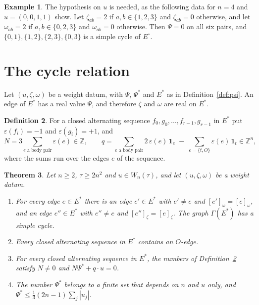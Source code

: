 \documentclass[11pt]{amsart}
\newtheorem{theorem}{Theorem}[section]
\theoremstyle{definition}
\newtheorem{definition}[theorem]{Definition}
\newtheorem{example}[theorem]{Example}
\theoremstyle{remark}
\numberwithin{equation}{section}
\newcommand{\ZZ}{\mathbb{Z}}
\newcommand{\Ps}{\Psi^{*}}
\newcommand{\Es}{E^{*}}
\newcommand{\Eo}{E^{\circ}}
\newcommand{\one}[1]{\mathbf{1}_{#1}}
\newcommand{\nd}[2]{[#1]_{#2}}
\begin{document}
\begin{example}\label{ex:0011}
The hypothesis on $u$ is needed, as the following data for $n = 4$ and $u = (0, 0, 1, 1)$ show. Let
$\zeta_{ab} = 2$ if
$a, b \in \{1, 2, 3\}$ and $\zeta_{ab} = 0$ otherwise, and let $\omega_{ab} = 2$ if $a, b \in \{0, 2, 3\}$
and $\omega_{ab} = 0$ otherwise. Then $\Psi = 0$ on all six pairs, and
$\{0, 1\}, \{1, 2\}, \{2, 3\}, \{0, 3\}$ is a simple cycle of $\Eo$.
\end{example}

\section{The cycle relation}\label{sec:D4}

Let $(u, \zeta, \omega)$ be a weight datum, with $\Psi$, $\Ps$ and $\Es$ as in Definition~\ref{def:psi}.
An edge of $\Es$ has a real value $\Psi$, and therefore $\zeta$ and $\omega$ are real on $\Es$.

\begin{definition}\label{def:cycle}
For a closed alternating sequence $f_0, g_0, \dots, f_{r-1}, g_{r-1}$ in $\Es$ put
$\varepsilon(f_i) = -1$ and $\varepsilon(g_i) = +1$, and
\[
  N = 3 \sum_{e \text{ a body pair}} \varepsilon(e) \in \ZZ , \qquad
  q = \sum_{e \text{ a body pair}} 2\, \varepsilon(e)\, \one{e}
      \;-\; \sum_{e = \{t, O\}} \varepsilon(e)\, \one{t} \in \ZZ^n ,
\]
where the sums run over the edges $e$ of the sequence.
\end{definition}

\begin{theorem}\label{thm:D4}
Let $n \ge 2$, $\tau \ge 2n^2$ and $u \in W_n(\tau)$, and let $(u, \zeta, \omega)$ be a weight datum.
\begin{enumerate}
\item[(a)] For every edge $e \in \Es$ there is an edge $e' \in \Es$ with $e' \ne e$ and
$\nd{e'}{\omega} = \nd{e}{\omega}$, and an edge $e'' \in \Es$ with $e'' \ne e$ and
$\nd{e''}{\zeta} = \nd{e}{\zeta}$. The graph $\Gamma(\Es)$ has a simple cycle.
\item[(b)] Every closed alternating sequence in $\Es$ contains an $O$-edge.
\item[(c)] For every closed alternating sequence in $\Es$, the numbers of Definition~\ref{def:cycle}
satisfy $N \ne 0$ and $N \Ps + q \cdot u = 0$.
\item[(d)] The number $\Ps$ belongs to a finite set that depends on $n$ and $u$ only, and
$\Ps \le \tfrac13 (2n - 1) \sum_{j} |u_j|$.
\end{enumerate}
\end{theorem}
\end{document}
